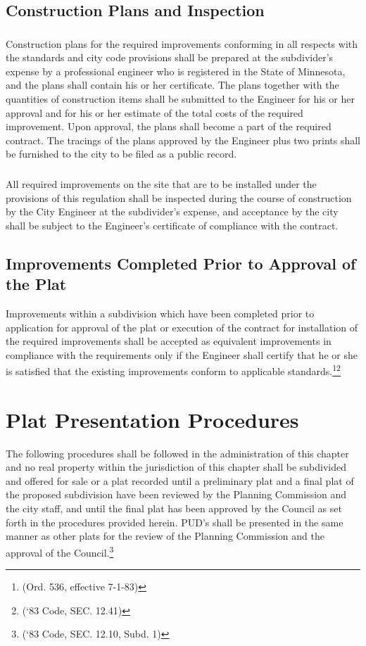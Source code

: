 \subsection{Construction Plans and Inspection}
\subsubsection{}
Construction plans for the required improvements conforming in all respects with the standards and city code provisions shall be prepared at the subdivider’s expense by a professional engineer who is registered in the State of Minnesota, and the plans shall contain his or her certificate. The plans together with the quantities of construction items shall be submitted to the Engineer for his or her approval and for his or her estimate of the total costs of the required improvement. Upon approval, the plans shall become a part of the required contract. The tracings of the plans approved by the Engineer plus two prints shall be furnished to the city to be filed as a public record.
\subsubsection{}
All required improvements on the site that are to be installed under the provisions of this regulation shall be inspected during the course of construction by the City Engineer at the subdivider’s expense, and acceptance by the city shall be subject to the Engineer’s certificate of compliance with the contract.
\subsection{Improvements Completed Prior to Approval of the Plat}
Improvements within a subdivision which have been completed prior to application for approval of the plat or execution of the contract for installation of the required improvements shall be accepted as equivalent improvements in compliance with the requirements only if the Engineer shall certify that he or she is satisfied that the existing improvements conform to applicable standards.\footnote{(Ord. 536, effective 7-1-83)}\footnote{(‘83 Code, SEC. 12.41)}


\setcounter{section}{64}
\section{Plat Presentation Procedures}
The following procedures shall be followed in the administration of this chapter and no real property within the jurisdiction of this chapter shall be subdivided and offered for sale or a plat recorded until a preliminary plat and a final plat of the proposed subdivision have been reviewed by the Planning Commission and the city staff, and until the final plat has been approved by the Council as set forth in the procedures provided herein. PUD’s shall be presented in the same manner as other plats for the review of the Planning Commission and the approval of the Council.\footnote{(‘83 Code, SEC. 12.10, Subd. 1)}

